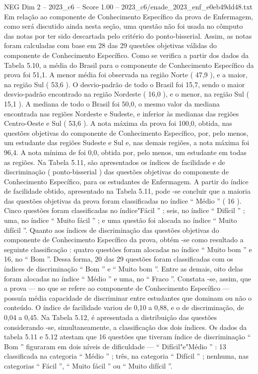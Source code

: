 \begin{textsample}{NEG Dim 2 – 2023\_c6 – Score 1.00 – 2023\_c6/enade\_2023\_enf\_e0eb49dd48.txt}
Em relação ao componente de Conhecimento Específico da prova de Enfermagem, como será discutido ainda nesta seção, uma questão não foi usada no cômputo das notas por ter sido descartada pelo critério do ponto-bisserial.
Assim, as notas foram calculadas com base em 28 das 29 questões objetivas válidas do componente de Conhecimento Específico.
Como se verifica a partir dos dados da Tabela 5.10, a média do Brasil para o componente de Conhecimento Específico da prova foi 51,1.
A menor média foi observada na região Norte ( 47,9 ), e a maior, na região Sul ( 53,6 ).
O desvio-padrão de todo o Brasil foi 15,7, sendo o maior desvio-padrão encontrado na região Nordeste ( 16,0 ), e o menor, na região Sul ( 15,1 ).
A mediana de todo o Brasil foi 50,0, o mesmo valor da mediana encontrada nas regiões Nordeste e Sudeste, e inferior às medianas das regiões Centro-Oeste e Sul ( 53,6 ).
A nota máxima da prova foi 100,0, obtida, nas questões objetivas do componente de Conhecimento Específico, por, pelo menos, um estudante das regiões Sudeste e Sul e, nas demais regiões, a nota máxima foi 96,4.
A nota mínima de foi 0,0, obtida por, pelo menos, um estudante em todas as regiões.
Na Tabela 5.11, são apresentados os índices de facilidade e de discriminação ( ponto-bisserial ) das questões objetivas do componente de Conhecimento Específico, para os estudantes de Enfermagem.
A partir do índice de facilidade obtido, apresentado na Tabela 5.11, pode -se concluir que a maioria das questões objetivas da prova foram classificadas no índice “ Médio ” ( 16 ).
Cinco questões foram classificadas no índice"Fácil ” ; seis, no índice “ Difícil ” ; uma, no índice “ Muito fácil ” ; e uma questão foi alocada no índice “ Muito difícil ”.
Quanto aos índices de discriminação das questões objetivas do componente de Conhecimento Específico da prova, obtém -se como resultado a seguinte classificação : quatro questões foram alocadas no índice “ Muito bom ” e 16, no “ Bom ”.
Dessa forma, 20 das 29 questões foram classificadas com os índices de discriminação “ Bom ” e “ Muito bom ”.
Entre as demais, oito delas foram alocadas no índice “ Médio ” e uma, no “ Fraco ”.
Constata -se, assim, que a prova — no que se refere ao componente de Conhecimento Específico — possuía média capacidade de discriminar entre estudantes que dominam ou não o conteúdo.
O índice de facilidade variou de 0,10 a 0,88, e o de discriminação, de 0,04 a 0,45.
Na Tabela 5.12, é apresentada a distribuição das questões considerando -se, simultaneamente, a classificação dos dois índices.
Os dados da tabela 5.11 e 5.12 atestam que 16 questões que tiveram índice de discriminação “ Bom ” figuraram em dois níveis de dificuldade — “ Difícil"e"Médio ” : 13 classificada na categoria “ Médio ” ; três, na categoria “ Difícil ” ; nenhuma, nas categorias “ Fácil ”, “ Muito fácil ” ou “ Muito difícil ”.

\end{textsample}

